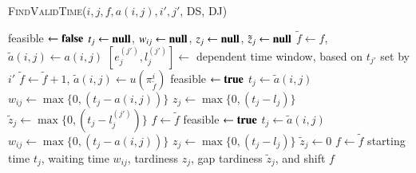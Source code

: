 \documentclass[a4paper,11pt,authoryear]{elsarticle}
\begin{document}
\begin{algorithm}[htbp!]
\caption{\textsc{FindValidTime}($i, j, f, a(i,j), i', j'$, DS, DJ)}
\label{alg:fvt}
\begin{algorithmic}[1]
	\State feasible $\gets \textbf{false}$
	\State $t_j \gets \textbf{null}$, $w_{ij} \gets \textbf{null}$, $z_j \gets \textbf{null}$, $\tilde{z}_j \gets \textbf{null}$
	\State $\tilde{f} \gets f$, $\tilde{a}(i,j) \gets a(i,j)$
		\State $[e_j^{(j')}, l_j^{(j')}] \gets$ dependent time window, based on $t_{j'}$ set by $i'$
	\EndIf
		\State $\tilde{f} \gets \tilde{f}+1$, $\tilde{a}(i,j) \gets u(\pi_{\tilde{f}}^{i})$
				\Continue
			\Else
				\State feasible $\gets \textbf{true}$
				\State $t_j \gets \tilde{a}(i,j)$
				\State $w_{ij} \gets \max\{0, (t_j - a(i,j))\}$
				\State $z_j \gets \max\{0, (t_j - l_j)\}$
				\State $\tilde{z}_j \gets \max\{0, (t_j - l_j^{(j')})\}$
				\State $f \gets \tilde{f}$
			\EndIf
		\Else
				\Continue
			\Else
				\State feasible $\gets \textbf{true}$
				\State $t_j \gets \tilde{a}(i,j)$
				\State $w_{ij} \gets \max\{0, (t_j - a(i,j))\}$
				\State $z_j \gets \max\{0, (t_j - l_j)\}$
				\State $\tilde{z}_j \gets 0$
				\State $f \gets \tilde{f}$
			\EndIf
		\EndIf
	\EndWhile
	\Return starting time $t_j$, waiting time $w_{ij}$, tardiness $z_j$, gap tardiness $\tilde{z}_j$, and shift $f$
\end{algorithmic}
\end{algorithm}
\end{document}
